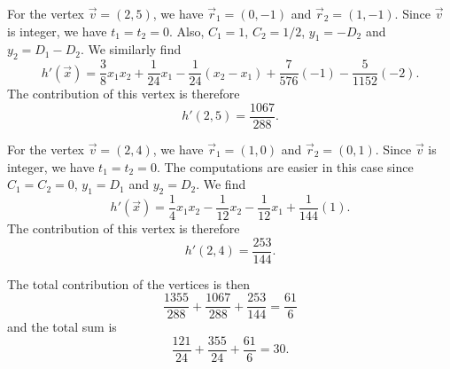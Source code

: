 \begin{example}
%
For the vertex $\vec v = (2,5)$, we have
$\vec r_1 = (0,-1)$ and $\vec r_2 = (1,-1)$.
Since $\vec v$ is integer, we have $t_1 = t_2 = 0$.
Also, $C_1 = 1$, $C_2 = 1/2$, $y_1 = -D_2$ and $y_2 = D_1 - D_2$.
We similarly find
$$
h'(\vec x)
=
\frac 3 8 x_1 x_2 + \frac 1{24} x_1 - \frac 1{24} (x_2 - x_1)
+ \frac 7{576} (-1)
- \frac 5{1152} (-2)
.
$$
The contribution of this vertex is therefore
$$
h'(2,5) = \frac {1067}{288}
.
$$

%
For the vertex $\vec v = (2,4)$, we have
$\vec r_1 = (1,0)$ and $\vec r_2 = (0,1)$.
Since $\vec v$ is integer, we have $t_1 = t_2 = 0$.
The computations are easier in this case since
$C_1 = C_2 = 0$, $y_1 = D_1$ and $y_2 = D_2$.
We find
$$
h'(\vec x)
=
\frac 1 4 x_1 x_2 - \frac 1{12} x_2 - \frac 1{12} x_1
+ \frac 1{144} (1)
.
$$
The contribution of this vertex is therefore
$$
h'(2,4) = \frac {253}{144}
.
$$

The total contribution of the vertices is then
$$
\frac {1355}{288} + \frac {1067}{288} + \frac {253}{144}
= \frac {61}6
$$
and the total sum is
$$
\frac{121}{24}+\frac{355}{24}+\frac{61}6 = 30
.
$$

\end{example}

